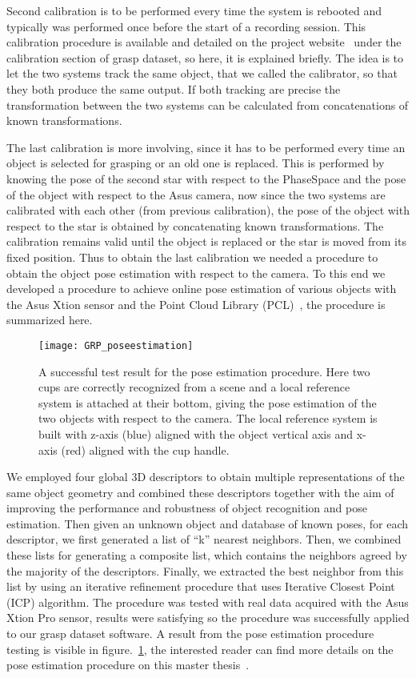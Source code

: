 Second calibration is to be performed every time the system is rebooted and typically was performed once before the start of a recording session. 
This calibration procedure is available and detailed on the project website~\cite{website:pacman:dataset} under the calibration section of grasp dataset, so here, it is explained briefly.
The idea is to let the two systems track the same object, that we called the calibrator, so that they both produce the same output. If both tracking are precise the transformation between the two systems can be calculated
from concatenations of known transformations.

The last calibration is more involving, since it has to be performed every time an object is selected for grasping or an old one is replaced. This is performed by knowing the pose of the second star with respect to the PhaseSpace and the
pose of the object with respect to the Asus camera, now since the two systems are calibrated with each other (from previous calibration), the pose of the object with respect to the star is obtained by concatenating known transformations.
The calibration remains valid until the object is replaced or the star is moved from its fixed position.
Thus to obtain the last calibration we needed a procedure to obtain the object pose estimation with respect to the camera. To this end we developed a procedure to achieve online pose estimation of various objects with the Asus Xtion sensor
and the Point Cloud Library (PCL)~\cite{web:pcl}, the procedure is summarized here.

\begin{figure}[!tb]
  \centering
  \texttt{[image: GRP\_poseestimation]}
  \caption{A successful test result for the pose estimation procedure. Here two cups are correctly recognized from a scene and a local reference system is attached at their bottom, giving the pose estimation of the two objects with respect to the camera.
  The local reference system is built with z-axis (blue) aligned with the object vertical axis and x-axis (red) aligned with the cup handle.}
  \label{fig:grasp:pe}
\end{figure}
We employed four global 3D descriptors to obtain multiple representations of the same object geometry and combined these descriptors together with the aim of improving the performance and robustness of object recognition and pose estimation.
Then given an unknown object and database of known poses, for each descriptor, we first generated a list of ``k'' nearest neighbors. Then, we combined these lists for generating a composite list, which contains the neighbors agreed
by the majority of the descriptors. Finally, we extracted the best neighbor from this list by using an iterative refinement procedure that uses Iterative Closest Point (ICP) algorithm. The procedure was tested with real data acquired
with the Asus Xtion Pro sensor, results were satisfying so the procedure was successfully applied to our grasp dataset software. A result from the pose estimation procedure testing is visible in figure.~\ref{fig:grasp:pe}, the interested reader 
can find more details on the pose estimation procedure on this master thesis~\cite{thesis:spinelli}. 
